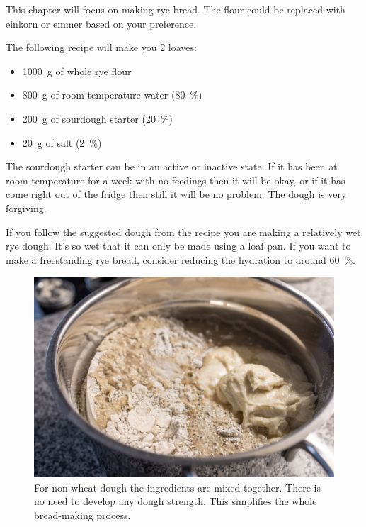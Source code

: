 This chapter will focus on making rye bread. The flour could
be replaced with einkorn or emmer based on your preference.

The following recipe will make you 2 loaves:
\begin{itemize}
  \item \qty{1000}{\gram} of whole rye flour
  \item \qty{800}{\gram} of room temperature water (\qty{80}{\percent})
  \item \qty{200}{\gram} of sourdough starter (\qty{20}{\percent})
  \item \qty{20}{\gram} of salt (\qty{2}{\percent})
\end{itemize}

The sourdough starter can be in an active or inactive state. If it has been
at room temperature for a week with no feedings then it will be okay, or 
if it has come right out of the fridge then still it will be no problem.
The dough is very forgiving.

If you follow the suggested dough from the recipe you are making a relatively
wet rye dough. It's so wet that it can only be made using a loaf pan. If
you want to make a freestanding rye bread, consider reducing the hydration
to around \qty{60}{\percent}.

\begin{figure}[!htb]
  \includegraphics[width=\textwidth]{ingredients}
  \caption[Non-wheat dough]{For non-wheat dough the ingredients are mixed
      together. There is no need to develop any dough strength. This
      simplifies the whole bread-making process.}%
  \label{fig:non-wheat-ingredients}
\end{figure}

